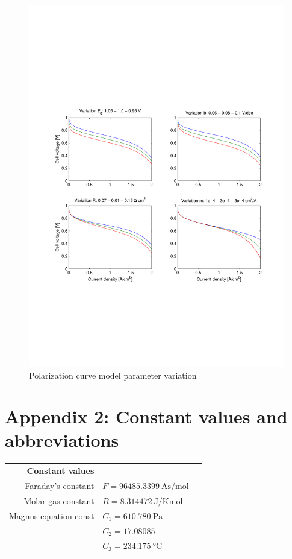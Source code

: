\documentclass[11pt,a4paper,english,twoside]{scrreprt}
\begin{document}
\begin{figure}
  \centering
  \includegraphics*[width=\textwidth,angle=0]{FCF_Chart_PolCurve_Parameters.pdf}
  \caption[Polarization curve model parameter variation]{Polarization curve model parameter variation}
  \label{fig:PolCurveModel}
\end{figure}



\chapter{Appendix 2: Constant values and abbreviations}
\label{sec:const}

\begin{tabular}{rlc}

\textbf{Constant values}                      &                        \\

Faraday's constant      & $F = \SI{96485.3399}{\ampere\second\per\mole}$ \cite{NIST} \\
Molar gas constant      & $R = \SI{8.314472}{\joule\per\kelvin\mole}$ \cite{NIST} \\
Magnus equation const   & $C_1 = \SI{610.780}{\pascal}$ \\
                        & $C_2 = \num{17.08085}$ \\
                        & $C_3 = \SI{234.175}{\degreeCelsius}$
\end{tabular}
\end{document}
